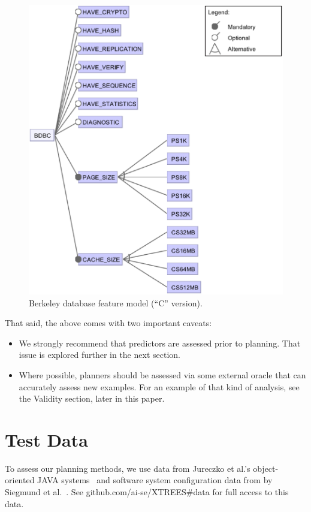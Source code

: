 \documentclass{sig-alternate}
\newcommand{\bi}{\begin{itemize}}
\newcommand{\ei}{\end{itemize}}
\begin{document}
\begin{figure}[!t]
\includegraphics[width=1\linewidth]{_figs/BDBC.eps}
\caption{ Berkeley database feature model   (``C'' version). }\label{fig:bdbc}
\end{figure}

That said, the above comes with two important caveats:
\bi
\item 
We   strongly recommend that predictors are assessed prior to planning. That
issue is explored further in the next section. 
\item
Where possible, planners should be assessed via some external
oracle that can accurately assess new examples. For an example of that kind of analysis,
see the Validity section, later in this paper.
\ei

  \section{Test Data}
To assess our planning methods, we use data from Jureczko et al.'s object-oriented JAVA systems~\cite{jureczko10}  and
  software system   configuration data from by  Siegmund et al.~\cite{sven12}.
  See github.com/ai-se/XTREES\#data for full access to this data.
  
\end{document}
